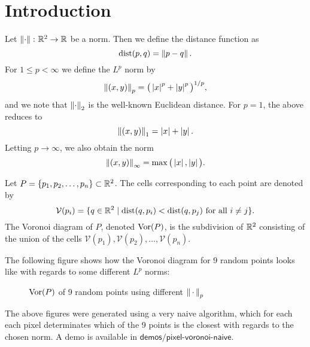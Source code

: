 \section{Introduction}
Let $\left\lVert \cdot \right\rVert \colon \mathbb{R}^2 \to \mathbb{R}$ be a norm. Then we define the distance function as
\begin{equation}
    \operatorname{dist}(p, q) = \left\lVert p - q \right\rVert.
\end{equation}
For $1 \leq p < \infty$ we define the $L^p$ norm by
\begin{equation}
    \left\lVert (x, y) \right\rVert_p = {\big(\left\lvert x \right\rvert^p + \left\lvert y \right\rvert^p\big)}^{1/p},
\end{equation}
and we note that $\left\lVert  \cdot  \right\rVert_2$ is the well-known Euclidean distance. For $p = 1$, the above reduces to
\begin{equation}
    \left\lVert (x, y) \right\rVert_1 = \left\lvert x \right\rvert + \left\lvert y \right\rvert.
\end{equation}
Letting $p \to \infty$, we also obtain the norm
\begin{equation}
    \left\lVert (x, y) \right\rVert_{\infty} = \max\big(\left\lvert x \right\rvert, \left\lvert y \right\rvert\big).
\end{equation}
\begin{defn}
Let $P = \{p_1, p_2, \ldots, p_n\} \subset \mathbb{R}^2$. The cells corresponding to each point are denoted by
\[
    \mathcal{V}(p_i) = \{q \in \mathbb{R}^2 \mid \operatorname{dist}(q, p_i) < \operatorname{dist}(q, p_j) \text{ for all } i \ne j\}.
\]
The Voronoi diagram of $P$, denoted $\operatorname{Vor}(P)$, is the subdivision of $\mathbb{R}^2$ consisting of the union of the cells $\mathcal{V}(p_1), \mathcal{V}(p_2), \ldots, \mathcal{V}(p_n)$.
\end{defn}

The following figure shows how the Voronoi diagram for 9 random points looks like with regards to some different $L^p$ norms:

\begin{figure}[H]
    \centering
    \hspace{0mm}
    \caption{$\operatorname{Vor}(P)$ of 9 random points using different $\left\lVert \,\cdot\, \right\rVert_p$}
    \label{fig:naive-voronoi}
\end{figure}
The above figures were generated using a very naive algorithm, which for each each pixel determinates which of the 9 points is the closest with regards to the chosen norm. A demo is available in $\boxed{\textsf{demos/pixel-voronoi-naive}}$. \\

